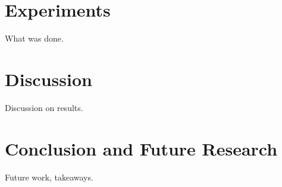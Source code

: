 \documentclass{article}
\begin{document}
\section{Experiments}

What was done.

\section{Discussion}

Discussion on results.

\section{Conclusion and Future Research}

Future work, takeaways.




\end{document}
